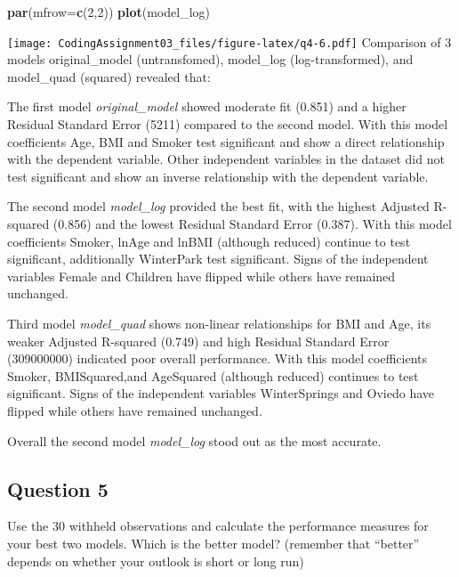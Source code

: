 \documentclass[
]{article}
\newenvironment{Shaded}{\begin{snugshade}}{\end{snugshade}}
\newcommand{\AttributeTok}[1]{\textcolor[rgb]{0.13,0.29,0.53}{#1}}
\newcommand{\DecValTok}[1]{\textcolor[rgb]{0.00,0.00,0.81}{#1}}
\newcommand{\FunctionTok}[1]{\textcolor[rgb]{0.13,0.29,0.53}{\textbf{#1}}}
\newcommand{\NormalTok}[1]{#1}
\begin{document}
\begin{Shaded}
\begin{Highlighting}[]
\FunctionTok{par}\NormalTok{(}\AttributeTok{mfrow=}\FunctionTok{c}\NormalTok{(}\DecValTok{2}\NormalTok{,}\DecValTok{2}\NormalTok{))}
\FunctionTok{plot}\NormalTok{(model\_log)}
\end{Highlighting}
\end{Shaded}

\texttt{[image: CodingAssignment03\_files/figure-latex/q4-6.pdf]}
Comparison of 3 models original\_model (untransfomed), model\_log
(log-transformed), and model\_quad (squared) revealed that:

The first model \emph{original\_model} showed moderate fit (0.851) and a
higher Residual Standard Error (5211) compared to the second model. With
this model coefficients Age, BMI and Smoker test significant and show a
direct relationship with the dependent variable. Other independent
variables in the dataset did not test significant and show an inverse
relationship with the dependent variable.

The second model \emph{model\_log} provided the best fit, with the
highest Adjusted R-squared (0.856) and the lowest Residual Standard
Error (0.387). With this model coefficients Smoker, lnAge and lnBMI
(although reduced) continue to test significant, additionally WinterPark
test significant. Signs of the independent variables Female and Children
have flipped while others have remained unchanged.

Third model \emph{model\_quad} shows non-linear relationships for BMI
and Age, its weaker Adjusted R-squared (0.749) and high Residual
Standard Error (309000000) indicated poor overall performance. With this
model coefficients Smoker, BMISquared,and AgeSquared (although reduced)
continues to test significant. Signs of the independent variables
WinterSprings and Oviedo have flipped while others have remained
unchanged.

Overall the second model \emph{model\_log} stood out as the most
accurate.

\subsection{Question 5}\label{question-5}

Use the 30 withheld observations and calculate the performance measures
for your best two models. Which is the better model? (remember that
``better'' depends on whether your outlook is short or long run)
\end{document}
